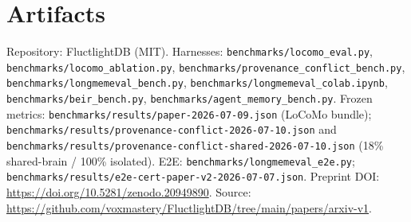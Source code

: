\documentclass[11pt]{article}
\begin{document}
\section*{Artifacts}
Repository: FluctlightDB (MIT). Harnesses: \texttt{benchmarks/locomo\_eval.py},
\texttt{benchmarks/locomo\_ablation.py},
\texttt{benchmarks/provenance\_conflict\_bench.py},
\texttt{benchmarks/longmemeval\_bench.py}, \texttt{benchmarks/longmemeval\_colab.ipynb},
\texttt{benchmarks/beir\_bench.py}, \texttt{benchmarks/agent\_memory\_bench.py}.
Frozen metrics: \texttt{benchmarks/results/paper-2026-07-09.json}
(LoCoMo bundle);
\texttt{benchmarks/results/provenance-conflict-2026-07-10.json}
and
\texttt{benchmarks/results/provenance-conflict-shared-2026-07-10.json}
(18\% shared-brain / 100\% isolated). E2E:
\texttt{benchmarks/longmemeval\_e2e.py};
\texttt{benchmarks/results/e2e-cert-paper-v2-2026-07-07.json}. Preprint DOI:
\url{https://doi.org/10.5281/zenodo.20949890}. Source:
\url{https://github.com/voxmastery/FluctlightDB/tree/main/papers/arxiv-v1}.



\end{document}
